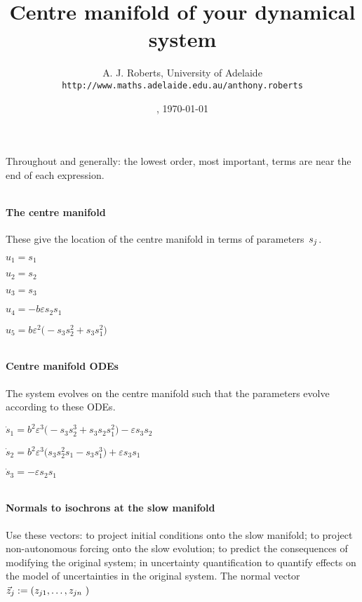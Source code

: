 \documentclass[11pt,a5paper]{article}
\title{Centre manifold of your dynamical system}
\author{A. J. Roberts, University of Adelaide\\
\texttt{http://www.maths.adelaide.edu.au/anthony.roberts}}
\date{\now, \today}
\def\eps{\varepsilon}
\begin{document}
\maketitle
Throughout and generally: the lowest order, most
important, terms are near the end of each expression.


\(
\)
\paragraph{The centre manifold}
These give the location of the centre manifold in
terms of parameters~\(s\sb j\).
\(
\)\par

\(u_{1}=s_{1}
\)\par

\(u_{2}=s_{2}
\)\par

\(u_{3}=s_{3}
\)\par

\(u_{4}=-b \eps s_{2} s_{1}
\)\par

\(u_{5}=b \eps^{2} \big(-s_{3} s_{2}^{2}+s_{3} s_{1}^{2}\big)
\)\par

\(
\)
\paragraph{Centre manifold ODEs}
The system evolves on the centre manifold such
that the parameters evolve according to these ODEs.
\(
\)\par

\(\dot s_{1}=b^{2} \eps^{3} \big(-s_{3} s_{2}^{3}+s_{3} s_{2} s_{1}^{2}
\big)-\eps s_{3} s_{2}
\)\par

\(\dot s_{2}=b^{2} \eps^{3} \big(s_{3} s_{2}^{2} s_{1}-s_{3} s_{1}^{3}
\big)+\eps s_{3} s_{1}
\)\par

\(\dot s_{3}=-\eps s_{2} s_{1}
\)\par

\(
\)
\paragraph{Normals to isochrons at the slow manifold}
Use these vectors: to project initial conditions
onto the slow manifold; to project non-autonomous
forcing onto the slow evolution; to predict the
consequences of modifying the original system; in
uncertainty quantification to quantify effects on
the model of uncertainties in the original system.
The normal vector \(\vec z\sb j:=(z\sb{j1},\ldots,z\sb{jn}\
)\)
\(
\)\par
\end{document}
